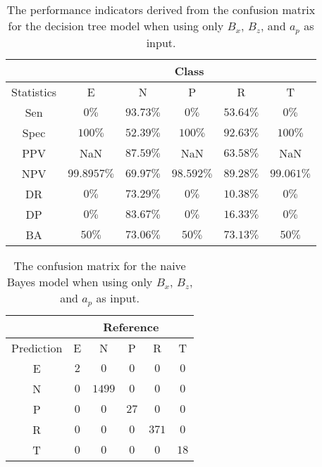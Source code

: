 \begin{table}[!ht]
	\centering
	\begin{tabular}{|c|c|c|c|c|c|}
		\hline
		 & \multicolumn{5}{c|}{Class} \\ \hline
		Statistics & E & N & P & R & T \\ \hline
		Sen & $0\%$ & $93.73\%$ & $0\%$ & $53.64\%$ & $0\%$ \\ \hline
		Spec & $100\%$ & $52.39\%$ & $100\%$ & $92.63\%$ & $100\%$ \\ \hline
		PPV & NaN & $87.59\%$ & NaN & $63.58\%$ & NaN \\ \hline
		NPV & $99.8957\%$ & $69.97\%$ & $98.592\%$ & $89.28\%$ & $99.061\%$ \\ \hline
		DR & $0\%$ & $73.29\%$ & $0\%$ & $10.38\%$ & $0\%$ \\ \hline
		DP & $0\%$ & $83.67\%$ & $0\%$ & $16.33\%$ & $0\%$ \\ \hline
		BA & $50\%$ & $73.06\%$ & $50\%$ & $73.13\%$ & $50\%$ \\ \hline
	\end{tabular}
	\caption{The performance indicators derived from the confusion matrix for the decision tree model when using only $B_{x}$, $B_{z}$, and $a_{p}$ as input.}
	\label{tab:cs:reverse:xzap:C5.0}
\end{table}

\begin{table}[!ht]
	\centering
	\begin{tabular}{|c|c|c|c|c|c|}
		\hline
		 & \multicolumn{5}{|c|}{Reference} \\ \hline
		 Prediction & E & N & P & R & T \\ \hline
		 E & $2$ & $0$ & $0$ & $0$ & $0$ \\ \hline
		 N & $0$ & $1499$ & $0$ & $0$ & $0$ \\ \hline
		 P & $0$ & $0$ & $27$ & $0$ & $0$ \\ \hline
		 R & $0$ & $0$ & $0$ & $371$ & $0$ \\ \hline
		 T & $0$ & $0$ & $0$ & $0$ & $18$ \\ \hline
	\end{tabular}
	\caption{The confusion matrix for the naive Bayes model when using only $B_{x}$, $B_{z}$, and $a_{p}$ as input.}
	\label{tab:cm:xzap:nb}
\end{table}

